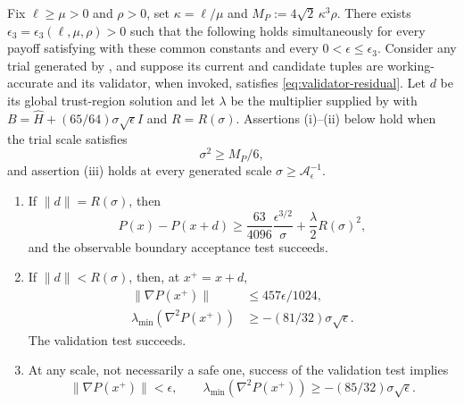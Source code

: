 \documentclass{article}
\begin{document}
\begin{lemma}
\label{lem:adaptive-fixed-radius-safe}
Fix $\ell\ge\mu>0$ and $\rho>0$, set
$\kappa=\ell/\mu$ and $M_P:=4\sqrt2\,\kappa^3\rho$.  There exists
$\epsilon_3=\epsilon_3(\ell,\mu,\rho)>0$ such that the following
holds simultaneously for every payoff satisfying 
with these common constants and every
$0<\epsilon\le\epsilon_3$.  Consider any trial generated by
, and suppose its current and
candidate tuples are working-accurate and its validator, when invoked,
satisfies \eqref{eq:validator-residual}.  Let $d$ be its global
trust-region solution and let $\lambda$ be the multiplier supplied by
 with
$B=\widehat H+(65/64)\sigma\sqrt\epsilon I$ and $R=R(\sigma)$.
Assertions (i)--(ii) below hold when
the trial scale satisfies
\begin{equation}\label{eq:adaptive-fixed-radius-safe-scale}
 \sigma^2\ge M_P/6,
\end{equation}
and assertion (iii) holds at every generated scale
$\sigma\ge\mathcal A_\epsilon^{-1}$.
\begin{enumerate}[label=(\roman*)]
 \item If $\|d\|=R(\sigma)$, then
 \begin{equation}\label{eq:safe-boundary-true-decrease}
  P(x)-P(x+d)
  \ge\frac{63}{4096}\frac{\epsilon^{3/2}}{\sigma}
       +\frac\lambda2R(\sigma)^2,
 \end{equation}
 and the observable boundary acceptance test succeeds.
 \item If $\|d\|<R(\sigma)$, then, at $x^+=x+d$,
 \begin{equation}\label{eq:safe-interior-true-bounds}
 \begin{aligned}
  \|\nabla P(x^+)\|&\le457\epsilon/1024,\\
  \lambda_{\min}(\nabla^2P(x^+))
   &\ge-(81/32)\sigma\sqrt\epsilon.
 \end{aligned}
 \end{equation}
 The validation test succeeds.
 \item At any scale, not necessarily a safe one, success of the
 validation test implies
 \begin{equation}\label{eq:validator-true-return}
  \|\nabla P(x^+)\|<\epsilon,
  \qquad
  \lambda_{\min}(\nabla^2P(x^+))
  \ge-(85/32)\sigma\sqrt\epsilon.
 \end{equation}
\end{enumerate}
\end{lemma}
\end{document}
